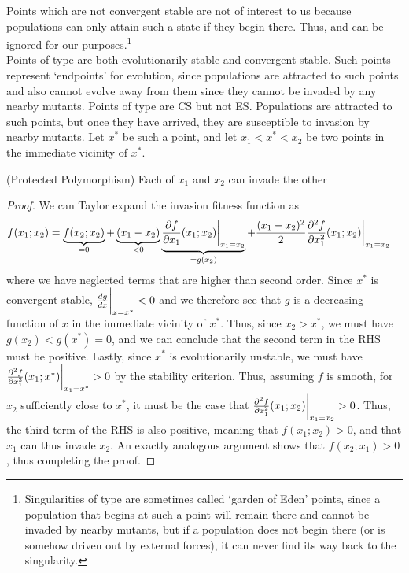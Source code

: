 Points which are not convergent stable are not of interest to us because populations can only attain such a state if they begin there. Thus,  and  can be ignored for our purposes.\footnote{Singularities of type  are sometimes called `garden of Eden' points, since a population that begins at such a point will remain there and cannot be invaded by nearby mutants, but if a population does not begin there (or is somehow driven out by external forces), it can never find its way back to the singularity.}\\
Points of type  are both evolutionarily stable and convergent stable. Such points represent `endpoints' for evolution, since populations are attracted to such points and also cannot evolve away from them since they cannot be invaded by any nearby mutants. Points of type  are CS but not ES. Populations are attracted to such points, but once they have arrived, they are susceptible to invasion by nearby mutants. Let $x^*$ be such a point, and let $x_1 < x^* < x_2$ be two points in the immediate vicinity of $x^*$.
\begin{claim}{(Protected Polymorphism)}
Each of $x_1$ and $x_2$ can invade the other
\end{claim}
\begin{proof}
We can Taylor expand the invasion fitness function as
\begin{align*}
    f(x_1 ; x_2) &= \underbrace{f(x_2 ; x_2)}_{=0} + \underbrace{(x_1 - x_2)}_{< 0 }\underbrace{\frac{\partial f}{\partial x_1}(x_1 ; x_2)\bigg{|}_{x_1 = x_2}}_{=g(x_2)} + \frac{(x_1-x_2)^2}{2} \frac{\partial^2 f}{\partial x_1^2}(x_1 ; x_2)\bigg{|}_{x_1 = x_2}
\end{align*}
where we have neglected terms that are higher than second order. Since $x^*$ is convergent stable, $\frac{d g}{dx}\bigg{|}_{x=x^*} < 0$ and we therefore see that $g$ is a decreasing function of $x$ in the immediate vicinity of $x^*$. Thus, since $x_2 > x^*$, we must have $g(x_2) < g(x^*) = 0$, and we can conclude that the second term in the RHS must be positive. Lastly, since $x^*$ is evolutionarily unstable, we must have $\frac{\partial^2 f}{\partial x_1^2}(x_1 ; x^*)\bigg{|}_{x_1 = x^*} > 0$ by the stability criterion. Thus, assuming $f$ is smooth, for $x_2$ sufficiently close to $x^*$, it must be the case that $\frac{\partial^2 f}{\partial x_1^2}(x_1 ; x_2)\bigg{|}_{x_1 = x_2} > 0$. Thus, the third term of the RHS is also positive, meaning that $f(x_1 ; x_2) > 0$, and that $x_1$ can thus invade $x_2$. An exactly analogous argument shows that $f(x_2 ; x_1) > 0$, thus completing the proof.
\end{proof}
